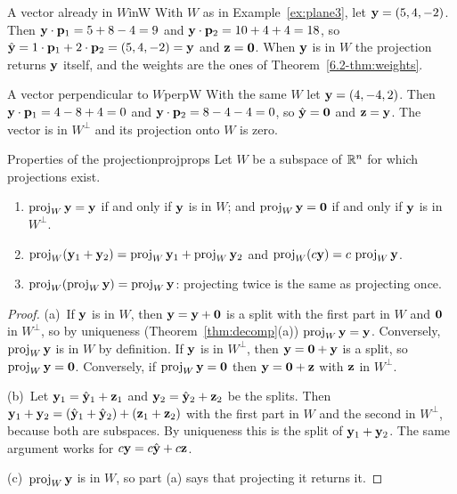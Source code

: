 \documentclass[11pt]{article}
\begin{document}
\begin{exmp}{A vector already in $W$}{inW}
With $W$ as in Example~\ref{ex:plane3}, let $\mathbf{y}=(5,4,-2)$. Then $\mathbf{y}\cdot\mathbf{p}_1=5+8-4=9$ and $\mathbf{y}\cdot\mathbf{p}_2=10+4+4=18$, so $\hat{\mathbf{y}}=1\cdot\mathbf{p}_1+2\cdot\mathbf{p}_2=(5,4,-2)=\mathbf{y}$ and $\mathbf{z}=\mathbf{0}$. When $\mathbf{y}$ is in $W$ the projection returns $\mathbf{y}$ itself, and the weights are the ones of Theorem~\ref{6.2-thm:weights}.
\end{exmp}

\begin{exmp}{A vector perpendicular to $W$}{perpW}
With the same $W$ let $\mathbf{y}=(4,-4,2)$. Then $\mathbf{y}\cdot\mathbf{p}_1=4-8+4=0$ and $\mathbf{y}\cdot\mathbf{p}_2=8-4-4=0$, so $\hat{\mathbf{y}}=\mathbf{0}$ and $\mathbf{z}=\mathbf{y}$. The vector is in $W^{\perp}$ and its projection onto $W$ is zero.
\end{exmp}

\begin{thm}{Properties of the projection}{projprops}
Let $W$ be a subspace of $\mathbb{R}^n$ for which projections exist.
\begin{enumerate}[label=(\alph*),itemsep=1pt]
  \item $\operatorname{proj}_W\mathbf{y}=\mathbf{y}$ if and only if $\mathbf{y}$ is in $W$; and $\operatorname{proj}_W\mathbf{y}=\mathbf{0}$ if and only if $\mathbf{y}$ is in $W^{\perp}$.
  \item $\operatorname{proj}_W(\mathbf{y}_1+\mathbf{y}_2)=\operatorname{proj}_W\mathbf{y}_1+\operatorname{proj}_W\mathbf{y}_2$ and $\operatorname{proj}_W(c\mathbf{y})=c\,\operatorname{proj}_W\mathbf{y}$.
  \item $\operatorname{proj}_W(\operatorname{proj}_W\mathbf{y})=\operatorname{proj}_W\mathbf{y}$: projecting twice is the same as projecting once.
\end{enumerate}
\end{thm}

\begin{proof}
(a)~If $\mathbf{y}$ is in $W$, then $\mathbf{y}=\mathbf{y}+\mathbf{0}$ is a split with the first part in $W$ and $\mathbf{0}$ in $W^{\perp}$, so by uniqueness (Theorem~\ref{thm:decomp}(a)) $\operatorname{proj}_W\mathbf{y}=\mathbf{y}$. Conversely, $\operatorname{proj}_W\mathbf{y}$ is in $W$ by definition. If $\mathbf{y}$ is in $W^{\perp}$, then $\mathbf{y}=\mathbf{0}+\mathbf{y}$ is a split, so $\operatorname{proj}_W\mathbf{y}=\mathbf{0}$. Conversely, if $\operatorname{proj}_W\mathbf{y}=\mathbf{0}$ then $\mathbf{y}=\mathbf{0}+\mathbf{z}$ with $\mathbf{z}$ in $W^{\perp}$.

(b)~Let $\mathbf{y}_1=\hat{\mathbf{y}}_1+\mathbf{z}_1$ and $\mathbf{y}_2=\hat{\mathbf{y}}_2+\mathbf{z}_2$ be the splits. Then $\mathbf{y}_1+\mathbf{y}_2=(\hat{\mathbf{y}}_1+\hat{\mathbf{y}}_2)+(\mathbf{z}_1+\mathbf{z}_2)$ with the first part in $W$ and the second in $W^{\perp}$, because both are subspaces. By uniqueness this is the split of $\mathbf{y}_1+\mathbf{y}_2$. The same argument works for $c\mathbf{y}=c\hat{\mathbf{y}}+c\mathbf{z}$.

(c)~$\operatorname{proj}_W\mathbf{y}$ is in $W$, so part (a) says that projecting it returns it.
\end{proof}
\end{document}
